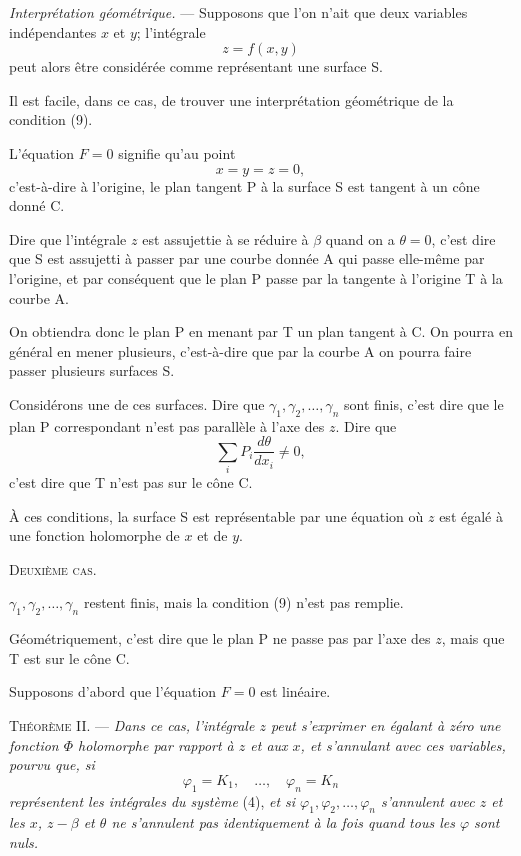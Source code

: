 \documentclass[11pt]{article}
\begin{document}
\emph{Interprétation géométrique.} — Supposons que l’on n’ait que deux variables indépendantes $x$ et $y$; l’intégrale
\[
z=f(x,y)
\]
peut alors être considérée comme représentant une surface S.

Il est facile, dans ce cas, de trouver une interprétation géométrique de la condition (9).

L’équation $F=0$ signifie qu’au point
\[
x=y=z=0,
\]
c’est-à-dire à l’origine, le plan tangent P à la surface S est tangent à un cône donné C.

Dire que l’intégrale $z$ est assujettie à se réduire à $\beta$ quand on a $\theta=0$, c’est dire que S est assujetti à passer par une courbe donnée A qui passe elle-même par l’origine, et par conséquent que le plan P passe par la tangente à l’origine T à la courbe A.

On obtiendra donc le plan P en menant par T un plan tangent à C. On pourra en général en mener plusieurs, c’est-à-dire que par la courbe A on pourra faire passer plusieurs surfaces S.

Considérons une de ces surfaces. Dire que $\gamma_1,\gamma_2,\ldots,\gamma_n$ sont finis, c’est dire que le plan P correspondant n’est pas parallèle à l’axe des $z$. Dire que
\[
\sum_i P_i\frac{d\theta}{dx_i}\ne0,
\]
c’est dire que T n’est pas sur le cône C.

À ces conditions, la surface S est représentable par une équation où $z$ est égalé à une fonction holomorphe de $x$ et de $y$.

\begin{center}
\textsc{Deuxième cas.}
\end{center}

$\gamma_1,\gamma_2,\ldots,\gamma_n$ restent finis, mais la condition (9) n’est pas remplie.

Géométriquement, c’est dire que le plan P ne passe pas par l’axe des $z$, mais que T est sur le cône C.

Supposons d’abord que l’équation $F=0$ est linéaire.

\medskip
\noindent\textsc{Théorème II.} — \emph{Dans ce cas, l’intégrale $z$ peut s’exprimer en égalant à zéro une fonction $\Phi$ holomorphe par rapport à $z$ et aux $x$, et s’annulant avec ces variables, pourvu que, si}
\[
\varphi_1=K_1,\quad \ldots,\quad \varphi_n=K_n
\]
\emph{représentent les intégrales du système} (4), \emph{et si $\varphi_1,\varphi_2,\ldots,\varphi_n$ s’annulent avec $z$ et les $x$, $z-\beta$ et $\theta$ ne s’annulent pas identiquement à la fois quand tous les $\varphi$ sont nuls.}
\end{document}
